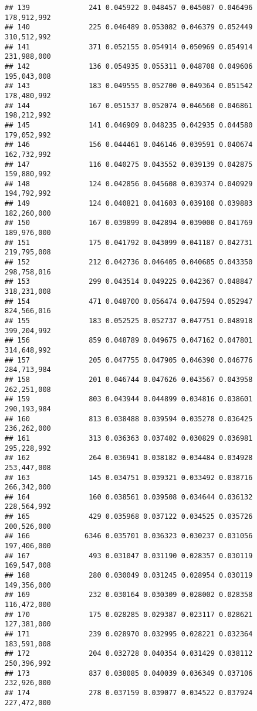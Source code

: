 \documentclass[]{article}
\begin{document}
\begin{verbatim}
## 139              241 0.045922 0.048457 0.045087 0.046496   178,912,992
## 140              225 0.046489 0.053082 0.046379 0.052449   310,512,992
## 141              371 0.052155 0.054914 0.050969 0.054914   231,988,000
## 142              136 0.054935 0.055311 0.048708 0.049606   195,043,008
## 143              183 0.049555 0.052700 0.049364 0.051542   178,480,992
## 144              167 0.051537 0.052074 0.046560 0.046861   198,212,992
## 145              141 0.046909 0.048235 0.042935 0.044580   179,052,992
## 146              156 0.044461 0.046146 0.039591 0.040674   162,732,992
## 147              116 0.040275 0.043552 0.039139 0.042875   159,880,992
## 148              124 0.042856 0.045608 0.039374 0.040929   194,792,992
## 149              124 0.040821 0.041603 0.039108 0.039883   182,260,000
## 150              167 0.039899 0.042894 0.039000 0.041769   189,976,000
## 151              175 0.041792 0.043099 0.041187 0.042731   219,795,008
## 152              212 0.042736 0.046405 0.040685 0.043350   298,758,016
## 153              299 0.043514 0.049225 0.042367 0.048847   318,231,008
## 154              471 0.048700 0.056474 0.047594 0.052947   824,566,016
## 155              183 0.052525 0.052737 0.047751 0.048918   399,204,992
## 156              859 0.048789 0.049675 0.047162 0.047801   314,648,992
## 157              205 0.047755 0.047905 0.046390 0.046776   284,713,984
## 158              201 0.046744 0.047626 0.043567 0.043958   262,251,008
## 159              803 0.043944 0.044899 0.034816 0.038601   290,193,984
## 160              813 0.038488 0.039594 0.035278 0.036425   236,262,000
## 161              313 0.036363 0.037402 0.030829 0.036981   295,228,992
## 162              264 0.036941 0.038182 0.034484 0.034928   253,447,008
## 163              145 0.034751 0.039321 0.033492 0.038716   266,342,000
## 164              160 0.038561 0.039508 0.034644 0.036132   228,564,992
## 165              429 0.035968 0.037122 0.034525 0.035726   200,526,000
## 166             6346 0.035701 0.036323 0.030237 0.031056   197,406,000
## 167              493 0.031047 0.031190 0.028357 0.030119   169,547,008
## 168              280 0.030049 0.031245 0.028954 0.030119   149,356,000
## 169              232 0.030164 0.030309 0.028002 0.028358   116,472,000
## 170              175 0.028285 0.029387 0.023117 0.028621   127,381,000
## 171              239 0.028970 0.032995 0.028221 0.032364   183,591,008
## 172              204 0.032728 0.040354 0.031429 0.038112   250,396,992
## 173              837 0.038085 0.040039 0.036349 0.037106   232,926,000
## 174              278 0.037159 0.039077 0.034522 0.037924   227,472,000

\end{verbatim}
\end{document}
